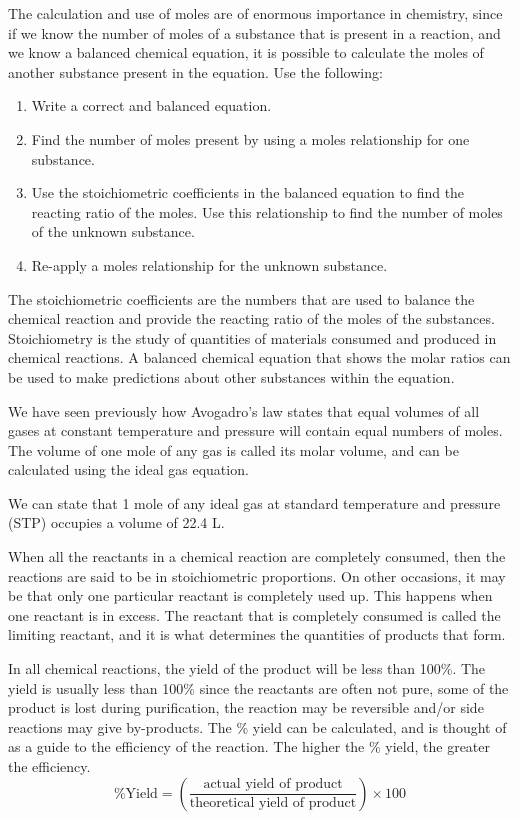 \documentclass[../chem.tex]{subfiles}
\begin{document}
The calculation and use of moles are of enormous importance in chemistry, since if we know the number of moles of a substance that is present 
in a reaction, and we know a balanced chemical equation, it is possible to calculate the moles of another substance present in the equation. Use the following:
\begin{enumerate}
    \item Write a correct and balanced equation.
    \item Find the number of moles present by using a moles relationship for one substance.
    \item Use the stoichiometric coefficients in the balanced equation to find the reacting ratio of the moles. Use this relationship to find the number of moles of the unknown substance.
    \item Re-apply a moles relationship for the unknown substance.
\end{enumerate}

The stoichiometric coefficients are the numbers that are used to balance the chemical reaction and provide the reacting ratio of the moles of the substances.
Stoichiometry is the study of quantities of materials consumed and produced in chemical reactions. A balanced chemical equation that shows the molar ratios 
can be used to make predictions about other substances within the equation.

We have seen previously how Avogadro's law states that equal volumes of all gases at constant temperature and pressure will contain equal numbers of moles. 
The volume of one mole of any gas is called its molar volume, and can be calculated using the ideal gas equation.

We can state that 1 mole of any ideal gas at standard temperature and pressure (STP) occupies a volume of 22.4 L.

When all the reactants in a chemical reaction are completely consumed, then the reactions are said to be in stoichiometric proportions.
On other occasions, it may be that only one particular reactant is completely used up. This happens when one reactant is in excess. The 
reactant that is completely consumed is called the limiting reactant, and it is what determines the quantities of products that form.

In all chemical reactions, the yield of the product will be less than 100\%. The yield is usually less than 100\% since the reactants are often 
not pure, some of the product is lost during purification, the reaction may be reversible and/or side reactions may give by-products. The \% yield 
can be calculated, and is thought of as a guide to the efficiency of the reaction. The higher the \% yield, the greater the efficiency.
\[\% \text{Yield} = \left(\frac{\text{actual yield of product}}{\text{theoretical yield of product}}\right)\times 100\]
\end{document}
